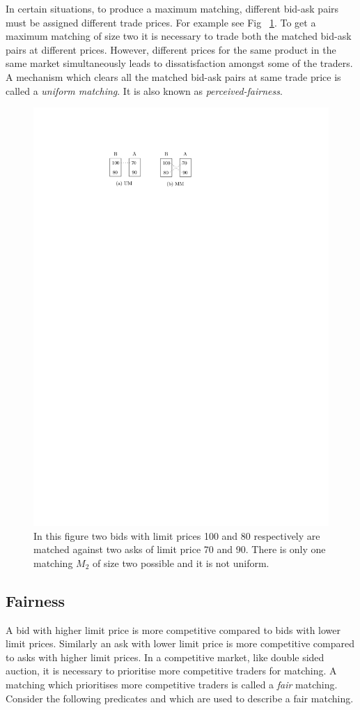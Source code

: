 \documentclass[a4paper,UKenglish,cleveref, autoref]{lipics-v2019}
\begin{document}
In certain situations, to produce a maximum matching, different bid-ask pairs must be assigned different trade prices. For example see Fig ~\ref{fig:mmum}. To get a maximum matching of size two it is necessary to trade both the matched bid-ask pairs at different prices.  However, different prices for the same product in the same market simultaneously leads to dissatisfaction amongst some of the traders. A mechanism which clears all the matched bid-ask pairs at same trade price is called a \emph{uniform matching}. It is also known as \emph{perceived-fairness}. 

\begin{figure}[h!]
\centering
\includegraphics[width=.5\textwidth]{mm_um.pdf}
\caption{In this figure two bids with limit prices 100 and 80 respectively are matched against two asks of limit price 70 and 90. There is only one matching $M_2$ of size two possible and it is not uniform.}
\label{fig:mmum}
\end{figure}

\subsection{Fairness}  

A bid with higher limit price is more competitive compared to bids with lower limit prices. Similarly an ask with lower limit price is more competitive compared to asks with higher limit prices. In a competitive market, like double sided auction, it is necessary to prioritise more competitive traders for matching. A matching which prioritises more competitive traders is called a \emph{fair} matching. Consider the following predicates  and   which are used to describe a fair matching. 
\end{document}
